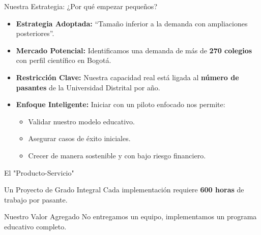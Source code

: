 \begin{frame}{Nuestra Estrategia: ¿Por qué empezar pequeños?}
    \begin{itemize}
        \item<1-> \textbf{Estrategia Adoptada:} ``Tamaño inferior a la demanda con ampliaciones posteriores''.
        \item<2-> \textbf{Mercado Potencial:} Identificamos una demanda de más de \textbf{270 colegios} con perfil científico en Bogotá.
        \item<3-> \textbf{Restricción Clave:} Nuestra capacidad real está ligada al \textbf{número de pasantes} de la Universidad Distrital por año.
        \item<4-> \textbf{Enfoque Inteligente:} Iniciar con un piloto enfocado nos permite:
        \begin{itemize}
            \item<5-> Validar nuestro modelo educativo.
            \item<6-> Asegurar casos de éxito iniciales.
            \item<7-> Crecer de manera sostenible y con bajo riesgo financiero.
        \end{itemize}
    \end{itemize}
\end{frame}



\begin{frame}{El "Producto-Servicio"}
    \begin{block}{Un Proyecto de Grado Integral}
        Cada implementación requiere \textbf{600 horas} de trabajo por pasante.
    \end{block}
    
    \vfill
    \begin{alertblock}{Nuestro Valor Agregado}
        No entregamos un equipo, implementamos un programa educativo completo.
    \end{alertblock}
\end{frame}



